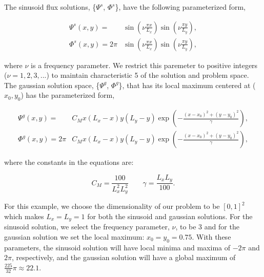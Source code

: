The sinusoid flux solutions, \{$\Psi^s$, $\Phi^s$\}, have the following parameterized form,

\begin{equation}
\label{eq::BF_Results_MMS_sinefluxsols}
\begin{aligned}
\Psi^s (x,y) = &\sin(\nu  \frac{\pi x}{L_x}) \sin(\nu  \frac{\pi y}{L_y}), \\ 
\Phi^s (x,y) = 2 \pi &\sin(\nu  \frac{\pi x}{L_x}) \sin(\nu  \frac{\pi y}{L_y}),
\end{aligned} 
\end{equation}

\noindent where $\nu$ is a frequency parameter. We restrict this paremeter to positive integers ($\nu = 1,2,3,...$) to maintain characteristic 5 of the solution and problem space. The gaussian solution space, \{$\Psi^g$, $\Phi^g$\}, that has its local maximum centered at ($x_0,y_0$) has the parameterized form,

\begin{equation}
\label{eq::BF_Results_MMS_gaussfluxsols}
\begin{aligned}
\Psi^g (x,y) = &C_M x (L_x - x) y (L_y - y) \exp(-\frac{(x-x_0)^2 + (y-y_0)^2}{\gamma}), \\ 
\Phi^g (x,y) = 2 \pi &C_M x (L_x - x) y (L_y - y) \exp(-\frac{(x-x_0)^2 + (y-y_0)^2}{\gamma}),
\end{aligned} 
\end{equation}

\noindent where the constants in the equations are:

\begin{equation}
\label{eq::BF_Results_MMS_gaussconsts}
C_M = \frac{100}{L_x^2 L_y^2} \qquad \gamma = \frac{L_x L_y}{100} .
\end{equation}

For this example, we choose the dimensionality of our problem to be $[0,1]^2$ which makes $L_x=L_y=1$ for both the sinusoid and gaussian solutions. For the sinusoid solution, we select the frequency parameter, $\nu$, to be 3 and for the gaussian solution we set the local maximum: $x_0=y_0 = 0.75$. With these parameters, the sinusoid solution will have local minima and maxima of $-2 \pi$ and $2 \pi$, respectively, and the gaussian solution will have a global maximum of $\frac{225}{32} \pi \approx 22.1$.




